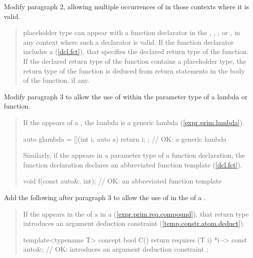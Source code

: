 Modify paragraph 2, allowing multiple occurrences of 
in those contexts where it is valid.

\begin{quote}
\pnum
{} placeholder type can appear with a function 
declarator in the 
, 
,
, or
,
in any context where such a declarator is valid. 
%
If the function declarator includes a 
 (\ref{dcl.fct}),
that specifies the declared return type of the function.
%
If the declared return type of the function contains a placeholder 
type, the return type of the function is deduced from return 
statements in the body of the function, if any.
\end{quote}

Modify paragraph 3 to allow the use of  within the 
parameter type of a lambda or function.

\begin{quote}
\pnum
If the   appears   of a
, the lambda is a generic lambda 
(\ref{expr.prim.lambda}).
%
\enterexample
\begin{codeblock}
auto glambda = [](int i, auto a) { return i; }; // OK: a generic lambda
\end{codeblock}
\exitexample
%
\begin{addedblock}
Similarly, if the  
appears in a parameter type of a function declaration, the function
declaration declares an abbreviated function template (\ref{dcl.fct}).
%
\enterexample
\begin{codeblock}
void f(const auto&, int); // OK: an abbreviated function template
\end{codeblock}
\exitexample
\end{addedblock}
\end{quote}

Add the following after paragraph 3 to allow the use of 
 in the 
 of a 
.

\begin{quote}
\pnum
If the   
appears in the  
of a  in
a  (\ref{expr.prim.req.compound}), that
return type introduces an argument deduction constraint
(\ref{temp.constr.atom.deduct}).
% 
\enterexample
\begin{codeblock}
template<typename T> concept bool C() {
  return requires (T i) { 
    {*i} -> const auto&; // OK: introduces an argument deduction constraint
  };
}
\end{codeblock}
\exitexample
\end{quote}

